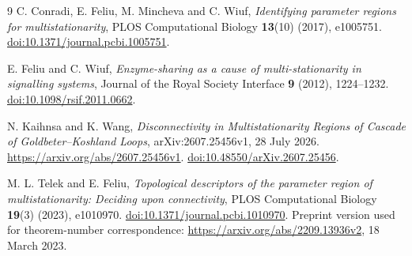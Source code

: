 \documentclass[11pt,a4paper]{article}
\numberwithin{equation}{section}
\theoremstyle{remark}\newtheorem{remark}[theorem]{Remark}
\begin{document}
\begin{thebibliography}{9}
C. Conradi, E. Feliu, M. Mincheva and C. Wiuf,
\emph{Identifying parameter regions for multistationarity},
PLOS Computational Biology \textbf{13}(10) (2017), e1005751.
\href{https://doi.org/10.1371/journal.pcbi.1005751}{doi:10.1371/journal.pcbi.1005751}.

E. Feliu and C. Wiuf,
\emph{Enzyme-sharing as a cause of multi-stationarity in signalling systems},
Journal of the Royal Society Interface \textbf{9} (2012), 1224--1232.
\href{https://doi.org/10.1098/rsif.2011.0662}{doi:10.1098/rsif.2011.0662}.

N. Kaihnsa and K. Wang,
\emph{Disconnectivity in Multistationarity Regions of Cascade of Goldbeter--Koshland Loops},
arXiv:2607.25456v1, 28 July 2026.
\url{https://arxiv.org/abs/2607.25456v1}.
\href{https://doi.org/10.48550/arXiv.2607.25456}{doi:10.48550/arXiv.2607.25456}.

M. L. Telek and E. Feliu,
\emph{Topological descriptors of the parameter region of multistationarity: Deciding upon connectivity},
PLOS Computational Biology \textbf{19}(3) (2023), e1010970.
\href{https://doi.org/10.1371/journal.pcbi.1010970}{doi:10.1371/journal.pcbi.1010970}.
Preprint version used for theorem-number correspondence:
\url{https://arxiv.org/abs/2209.13936v2}, 18 March 2023.
\end{thebibliography}
\end{document}
